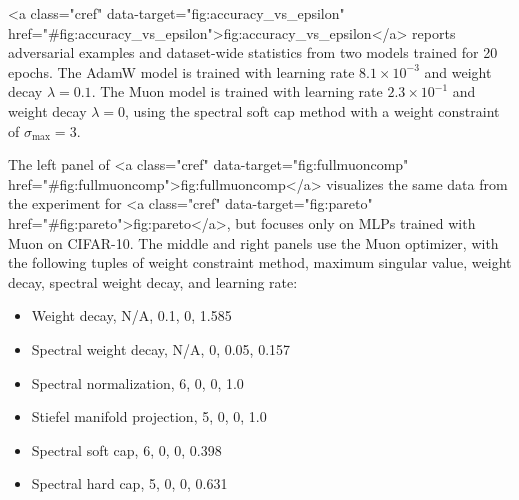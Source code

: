<a class="cref" data-target="fig:accuracy_vs_epsilon" href="#fig:accuracy_vs_epsilon">fig:accuracy_vs_epsilon</a> reports adversarial examples and dataset-wide statistics from two models trained for 20 epochs. The AdamW model is trained with learning rate $8.1 \times 10^{-3}$ and weight decay $\lambda = 0.1$. The Muon model is trained with learning rate $2.3 \times 10^{-1}$ and weight decay $\lambda = 0$, using the spectral soft cap method with a weight constraint of $\sigma_\text{max} = 3$.

The left panel of <a class="cref" data-target="fig:fullmuoncomp" href="#fig:fullmuoncomp">fig:fullmuoncomp</a> visualizes the same data from the experiment for <a class="cref" data-target="fig:pareto" href="#fig:pareto">fig:pareto</a>, but focuses only on MLPs trained with Muon on CIFAR-10. The middle and right panels use the Muon optimizer, with the following tuples of weight constraint method, maximum singular value, weight decay, spectral weight decay, and learning rate:
\begin{itemize}
    \item Weight decay, N/A, 0.1, 0, 1.585
    \item Spectral weight decay, N/A, 0, 0.05, 0.157
    \item Spectral normalization, 6, 0, 0, 1.0
    \item Stiefel manifold projection, 5, 0, 0, 1.0
    \item Spectral soft cap, 6, 0, 0, 0.398
    \item Spectral hard cap, 5, 0, 0, 0.631
\end{itemize}


